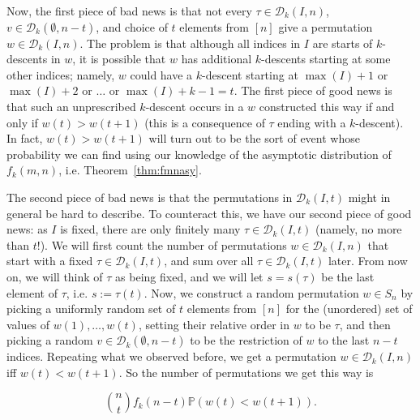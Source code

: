 \documentclass{amsart}
\theoremstyle{definition}
\begin{document}


Now, the first piece of bad news is that not every $\tau\in \mathcal{D}_k(I,n)$, $v\in \mathcal{D}_k(\emptyset,n-t)$, and choice of $t$ elements from $[n]$ give a permutation $w\in \mathcal{D}_k(I,n)$. The problem is that although all indices in $I$ are starts of $k$-descents in $w$, it is possible that $w$ has additional $k$-descents starting at some other indices; namely, $w$ could have a $k$-descent starting at $\max(I)+1$ or $\max(I)+2$ or $\ldots$ or $\max(I)+k-1=t$. The first piece of good news is that such an unprescribed $k$-descent occurs in a $w$ constructed this way if and only if $w(t)>w(t+1)$ (this is a consequence of $\tau$ ending with a $k$-descent). In fact, $w(t)>w(t+1)$ will turn out to be the sort of event whose probability we can find using our knowledge of the asymptotic distribution of $f_k(m,n)$, i.e. Theorem~\ref{thm:fmnasy}. 

The second piece of bad news is that the permutations in $\mathcal{D}_k(I,t)$ might in general be hard to describe. To counteract this, we have our second piece of good news: as $I$ is fixed, there are only finitely many $\tau\in \mathcal{D}_k(I,t)$ (namely, no more than $t!$). We will first count the number of permutations $w\in \mathcal{D}_k(I,n)$ that start with a fixed $\tau\in \mathcal{D}_k(I,t)$, and sum over all $\tau\in \mathcal{D}_k(I,t)$ later. From now on, we will think of $\tau$ as being fixed, and we will let $s=s(\tau)$ be the last element of $\tau$, i.e. $s:=\tau(t)$. Now, we construct a random permutation $w\in S_n$ by picking a uniformly random set of $t$ elements from $[n]$ for the (unordered) set of values of $w(1),\ldots, w(t)$, setting their relative order in $w$ to be $\tau$, and then picking a random $v\in \mathcal{D}_k(\emptyset,n-t)$ to be the restriction of $w$ to the last $n-t$ indices. Repeating what we observed before, we get a permutation $w\in \mathcal{D}_k(I,n)$ iff $w(t)<w(t+1)$. So the number of permutations we get this way is

\[\binom{n}{t}f_k(n-t)\mathbb{P}\left(w(t)<w(t+1)\right).\]
\end{document}
